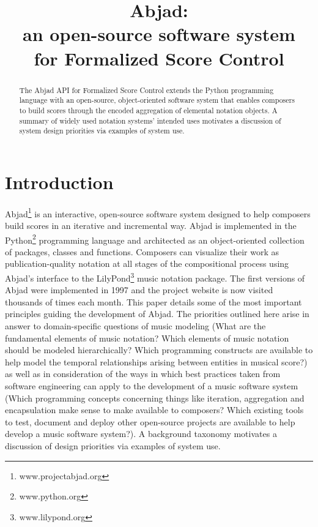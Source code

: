 \documentclass{article}
\title{Abjad: \\
an open-source software system \\
for Formalized Score Control}
\begin{document}
\capstartfalse
\maketitle
\capstarttrue

\begin{abstract}
The Abjad API for Formalized Score Control extends the Python programming
language with an open-source, object-oriented software system that enables
composers to build scores through the encoded aggregation of elemental notation
objects. A summary of widely used notation systems' intended uses motivates a
discussion of system design priorities via examples of system use.
\end{abstract}
\section{Introduction} \label{sec:introduction}

Abjad\footnote{www.projectabjad.org} is an interactive, open-source software
system designed to help composers build scores in an iterative and incremental
way.  Abjad is implemented in the Python\footnote{www.python.org} programming
language and architected as an object-oriented collection of packages, classes
and functions. Composers can visualize their work as publication-quality
notation at all stages of the compositional process using Abjad's interface to
the LilyPond\footnote{www.lilypond.org} music notation package. The first
versions of Abjad were implemented in 1997 and the project website is now
visited thousands of times each month. This paper details some of the most
important principles guiding the development of Abjad. The priorities outlined
here arise in answer to domain-specific questions of music modeling (What are
the fundamental elements of music notation? Which elements of music notation
should be modeled hierarchically? Which programming constructs are available to
help model the temporal relationships arising between entities in musical
score?) as well as in consideration of the ways in which best practices taken
from software engineering can apply to the development of a music software
system (Which programming concepts concerning things like iteration,
aggregation and encapsulation make sense to make available to composers? Which
existing tools to test, document and deploy other open-source projects are
available to help develop a music software system?). A background taxonomy
motivates a discussion of design priorities via examples of system use.
\end{document}
